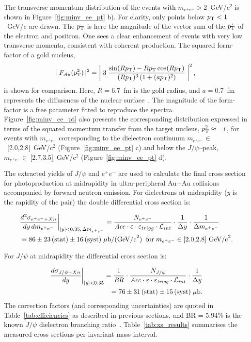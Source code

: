 \documentclass[dvipdfm]{elsart}
\def\tab#1{{Table~\ref{#1}}}
\def\fig#1{{Figure~\ref{#1}}}
\providecommand{\jpsi}{J/\psi}
\begin{document}
The transverse momentum distribution of the events with 
$m_{e^+e^-}>2$~GeV/c$^2$ is shown in \fig{fig:minv_ee_pt} b). For clarity, 
only points below $p_{\rm T}<1$~GeV/c are drawn. The $p_{\rm T}$ is here the magnitude of 
the vector sum of the $\vec{p_{\rm T}}$ of the electron and positron. One sees a 
clear enhancement of events with very low transverse momenta, consistent with 
coherent production. The squared form-factor of a gold nucleus,
\begin{equation}
| \, F_{Au}(p_{\rm T}^2) \, |^2 = \left| \; 3 \; \frac{\sin(R p_{\rm T}) - R p_{\rm T} \cos( R p_{\rm T})}{(R p_{\rm T})^3 \left(1 + (a p_{\rm T})^2\right)} \; \right|^2,
\label{eq:F_Au}
\end{equation}
is shown for comparison. Here, $R = 6.7$~fm is the gold radius, and 
$a=0.7$~fm represents the diffuseness of the nuclear 
surface~\cite{Davies:1976zz}. The magnitude of the form-factor is a free 
parameter fitted to reproduce the spectra. \fig{fig:minv_ee_pt} also presents 
the corresponding distribution expressed in terms of the squared momentum 
transfer from the target nucleus, $p_{\rm T}^2\approx -t$, for events with 
$m_{e^+e^-}$ corresponding to the dielectron continuum $m_{e^+e^-} 
\in$~\mbox{[2.0,2.8]}~GeV/c$^2$ (\fig{fig:minv_ee_pt} c) and below the 
$\jpsi$--peak, $m_{e^+e^-} \in~\mbox{[2.7,3.5]}$~GeV/c$^2$ 
(\fig{fig:minv_ee_pt} d).

The extracted yields of $\jpsi$ and $e^+ e^-$ are used to calculate the final 
cross section for photoproduction at midrapidity in ultra-peripheral Au+Au 
collisions accompanied by forward neutron emission. For dielectrons at 
midrapidity ($y$ is the rapidity of the pair) the double differential cross 
section is:

\begin{eqnarray}
 \left .\frac{d^2 \sigma_{e^+ e^- + Xn}}{d y \, d
     m_{e^+e^-}}\right|_{|y|<0.35, \, \Delta m_{e^+e^-}} = 
  \frac{N_{e^+ e^-}}{ \ensuremath{{\it Acc}} \cdot \varepsilon \cdot
    \varepsilon_{trigg} \cdot \mathcal{L}_{int} } \cdot
  \frac{1}{\Delta y} \cdot \frac{1}{\Delta m_{e^+e^-}} \qquad \\
  =  86  \pm  23\, {\rm(stat)} \pm 16 \, {\rm(syst)} \; \mu {\rm b/}({\rm
    GeV/c}^2) \; \; {\rm for} \; m_{e^+e^-}\in \mbox{[2.0,2.8] GeV/c}^2.
  \nonumber
\end{eqnarray} 

For $\jpsi$ at midrapidity the differential cross section is:

\begin{eqnarray}
\left .\frac{d\sigma_{\jpsi + Xn}}{dy}\right|_{|y|<0.35} =  
\frac{1}{\ensuremath{{\it BR}}}\cdot\frac{N_{\jpsi}}{\ensuremath{{\it
      Acc}}\cdot \varepsilon \cdot
\varepsilon_{\ensuremath{\it trigg}}\cdot {\mathcal L}_{int}}\cdot\frac{1}{\Delta y} \\
= 76 \pm 31 \, {\rm(stat)} \pm 15 \, {\rm(syst)} \; \mu {\rm b}.
\nonumber
\end{eqnarray}
\noindent
The correction factors (and corresponding uncertainties) are quoted in 
Table~\ref{tab:efficiencies} as described in previous sections, and BR = 
5.94\% is the known $\jpsi$ dielectron branching ratio~\cite{pdg}. 
\tab{tab:xs_results} summarises the measured cross sections per invariant 
mass interval.
\end{document}
